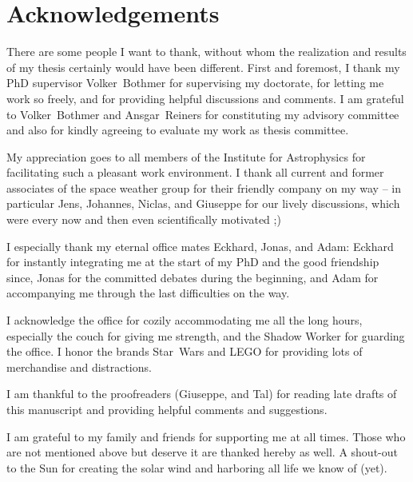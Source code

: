 
\chapter*{Acknowledgements}

There are some people I want to thank, without whom the realization and results of my thesis certainly would have been different.
First and foremost, I thank my PhD supervisor Volker~Bothmer for supervising my doctorate, for letting me work so freely, and for providing helpful discussions and comments.
I am grateful to Volker~Bothmer and Ansgar~Reiners for constituting my advisory committee and also for kindly agreeing to evaluate my work as thesis committee.

My appreciation goes to all members of the Institute for Astrophysics for facilitating such a pleasant work environment.
I thank all current and former associates of the space weather group for their friendly company on my way -- in particular Jens, Johannes, Niclas, and Giuseppe for our lively discussions, which were every now and then even scientifically motivated ;)

I especially thank my eternal office mates Eckhard, Jonas, and Adam:
Eckhard for instantly integrating me at the start of my PhD and the good friendship since,
Jonas for the committed debates during the beginning,
and Adam for accompanying me through the last difficulties on the way.

I acknowledge the office for cozily accommodating me all the long hours, especially the couch for giving me strength, and the Shadow Worker for guarding the office. I honor the brands Star~Wars and LEGO for providing lots of merchandise and distractions.

I am thankful to the proofreaders (Giuseppe, and Tal) for reading late drafts of this manuscript and providing helpful comments and suggestions.

I am grateful to my family and friends for supporting me at all times.
Those who are not mentioned above but deserve it are thanked hereby as well.
A shout-out to the Sun for creating the solar wind and harboring all life we know of (yet).




